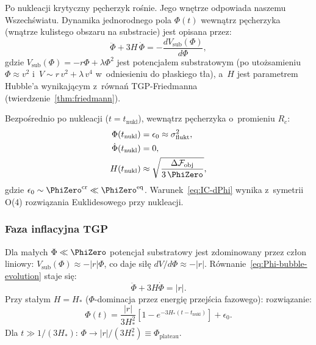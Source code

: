 Po nukleacji krytyczny p\k{e}cherzyk ro\'snie. Jego wn\k{e}trze
odpowiada naszemu Wszech\'swiatu. Dynamika jednorodnego
pola $\Phi(t)$ wewn\k{a}trz p\k{e}cherzyka (wn\k{a}trze kulistego
obszaru na substracie) jest opisana przez:
\begin{equation}\label{eq:Phi-bubble-evolution}
    \ddot{\Phi} + 3H\,\dot{\Phi}
    = -\frac{dV_\mathrm{sub}(\Phi)}{d\Phi},
\end{equation}
gdzie $V_\mathrm{sub}(\Phi) = -r\Phi + \lambda\Phi^2$
jest potencja\l{}em substratowym (po uto\.zsamieniu
$\Phi \approx v^2$ i~$V \sim r\,v^2 + \lambda\,v^4$
w~odniesieniu do p\l{}askiego t\l{}a), a~$H$ jest parametrem
Hubble'a wynikaj\k{a}cym z~r\'owna\'n TGP-Friedmanna
(twierdzenie~\ref{thm:friedmann}).

\begin{proposition}\label{prop:IC-nucleation}
Bezpo\'srednio po nukleacji ($t = t_\mathrm{nukl}$),
wewn\k{a}trz p\k{e}cherzyka o~promieniu $R_c$:
\begin{align}
    \Phi(t_\mathrm{nukl}) &= \epsilon_0 \approx \sigma^2_{\mathrm{flukt}},
    \label{eq:IC-Phi}\\
    \dot\Phi(t_\mathrm{nukl}) &= 0,
    \label{eq:IC-dPhi}\\
    H(t_\mathrm{nukl}) &\approx \sqrt{\frac{\Delta\mathcal{F}_\mathrm{obj}}{3\,\PhiZero}},
    \label{eq:IC-H}
\end{align}
gdzie $\epsilon_0 \sim \PhiZero^{\mathrm{cr}} \ll \PhiZero^{\mathrm{eq}}$.
Warunek~\eqref{eq:IC-dPhi} wynika z~symetrii O(4)
rozwi\k{a}zania Euklidesowego przy nukleacji.
\end{proposition}

\subsubsection{Faza inflacyjna TGP}

Dla ma\l{}ych $\Phi \ll \PhiZero$ potencja\l{} substratowy
jest zdominowany przez cz\l{}on liniowy:
$V_\mathrm{sub}(\Phi) \approx -|r|\Phi$,
co daje si\l{}\k{e} $dV/d\Phi \approx -|r|$.
R\'ownanie~\eqref{eq:Phi-bubble-evolution} staje si\k{e}:
\begin{equation}\label{eq:inflation-eq}
    \ddot\Phi + 3H\dot\Phi = |r|.
\end{equation}
Przy sta\l{}ym $H = H_*$ ($\Phi$-dominacja przez energi\k{e}
przej\'scia fazowego): rozwi\k{a}zanie:
\begin{equation}\label{eq:inflation-sol}
    \Phi(t) = \frac{|r|}{3H_*^2}\!\left[
        1 - e^{-3H_*(t-t_\mathrm{nukl})}
    \right]
    + \epsilon_0.
\end{equation}
Dla $t \gg 1/(3H_*)$: $\Phi \to |r|/(3H_*^2) \equiv \Phi_{\mathrm{plateau}}$.

